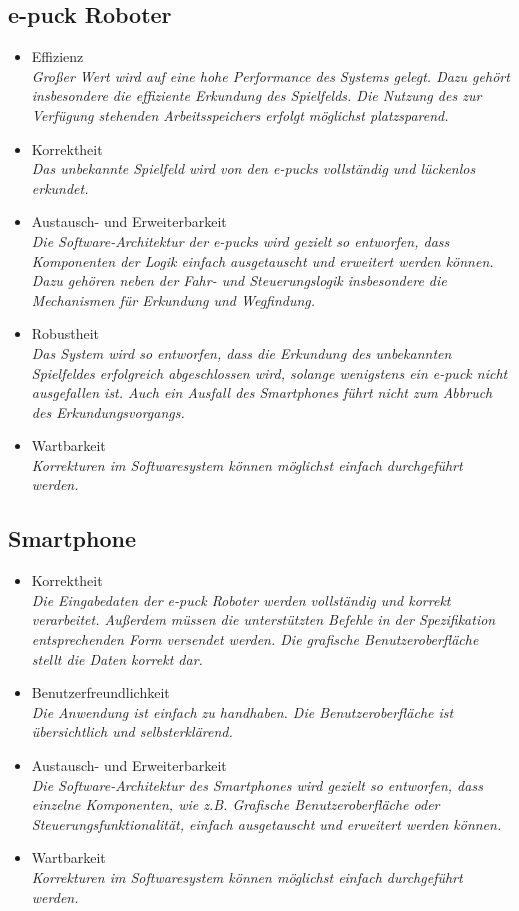 \documentclass[10pt,a4paper]{article}
\begin{document}
		\subsection{e-puck Roboter}
			\begin{itemize}
				\item Effizienz
					\\ \textsl{Großer Wert wird auf eine hohe Performance des Systems gelegt. Dazu gehört insbesondere die effiziente Erkundung
						des Spielfelds. Die Nutzung des zur Verfügung stehenden Arbeitsspeichers erfolgt möglichst platzsparend.}
				\item Korrektheit
					\\ \textsl{Das unbekannte Spielfeld wird von den e-pucks vollständig und lückenlos erkundet.}
				\item Austausch- und Erweiterbarkeit
					\\ \textsl{Die Software-Architektur der e-pucks wird gezielt so entworfen, dass Komponenten der Logik einfach ausgetauscht
						und erweitert werden können.
						Dazu gehören neben der Fahr- und Steuerungslogik insbesondere die Mechanismen für Erkundung und Wegfindung.}	
				\item Robustheit 
					\\ \textsl{Das System wird so entworfen, dass die Erkundung des unbekannten Spielfeldes erfolgreich abgeschlossen
						wird, solange wenigstens ein e-puck nicht ausgefallen ist.
						Auch ein Ausfall des Smartphones führt nicht zum Abbruch des Erkundungsvorgangs.	}	
				\item Wartbarkeit
					\\ \textsl{Korrekturen im Softwaresystem können möglichst einfach durchgeführt werden.}				
			\end{itemize}		
		
		\subsection{Smartphone}
			\begin{itemize}
				\item Korrektheit
					\\ \textsl{Die Eingabedaten der e-puck Roboter werden vollständig und korrekt verarbeitet. Außerdem
						müssen die unterstützten Befehle in der Spezifikation entsprechenden Form versendet werden. Die grafische
						Benutzeroberfläche stellt die Daten korrekt dar.}
				\item Benutzerfreundlichkeit
					\\ \textsl{Die Anwendung ist einfach zu handhaben. Die Benutzeroberfläche ist übersichtlich und selbsterklärend. }
				\item Austausch- und Erweiterbarkeit
					\\ \textsl{Die Software-Architektur des Smartphones wird gezielt so entworfen, dass einzelne Komponenten, wie z.B. 
						Grafische Benutzeroberfläche oder Steuerungsfunktionalität, einfach ausgetauscht und erweitert werden können.}						
				\item Wartbarkeit
					\\ \textsl{Korrekturen im Softwaresystem können möglichst einfach durchgeführt werden.}			
			\end{itemize}
	
\end{document}
